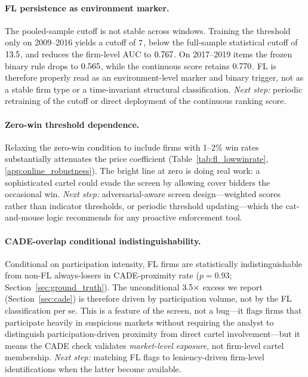 \paragraph{FL persistence as environment marker.}
The pooled-sample cutoff is not stable across windows. Training
the threshold only on 2009--2016 yields a cutoff of
$7$, below the full-sample statistical cutoff
of $13.5$, and reduces the firm-level AUC to
$0.767$. On 2017--2019 items the frozen binary
rule drops to $0.565$, while the continuous score
retains $0.770$. FL is therefore properly read as
an environment-level marker and binary trigger, not as a stable
firm type or a time-invariant structural classification.
\emph{Next step:} periodic retraining of the cutoff or direct
deployment of the continuous ranking score.

\paragraph{Zero-win threshold dependence.}
Relaxing the zero-win condition to include firms with 1--2\%
win rates substantially attenuates the price coefficient
(Table~\ref{tab:fl_lowwinrate}, \ref{app:online_robustness}).
The bright line at zero is doing real work: a sophisticated
cartel could evade the screen by allowing cover bidders the
occasional win. \emph{Next step:} adversarial-aware screen
design---weighted scores rather than indicator thresholds, or
periodic threshold updating---which the
\citet{harrington2008detecting} cat-and-mouse logic recommends
for any proactive enforcement tool.

\paragraph{CADE-overlap conditional indistinguishability.}
Conditional on participation intensity, FL firms are
statistically indistinguishable from non-FL always-losers in
CADE-proximity rate ($p = 0.93$;
Section~\ref{sec:ground_truth}). The unconditional
$3.5\times$ excess we report
(Section~\ref{sec:cade}) is therefore driven by participation
volume, not by the FL classification per se. This is a feature
of the screen, not a bug---it flags firms that participate
heavily in suspicious markets without requiring the analyst to
distinguish participation-driven proximity from direct cartel
involvement---but it means the CADE check validates
\emph{market-level exposure}, not firm-level cartel membership.
\emph{Next step:} matching FL flags to leniency-driven
firm-level identifications when the latter become available.

